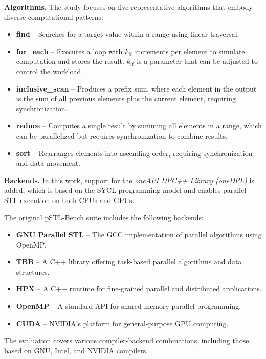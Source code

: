 \documentclass[sigconf]{acmart}
\newcommand{\mypar}[1]{{\bf #1.}}
\begin{document}
\mypar{Algorithms} The study focuses on five representative algorithms that embody diverse computational patterns:
\begin{itemize}
      \item \textbf{find} – Searches for a target value within a range using linear traversal.
      \item \textbf{for\_each} – Executes a loop with $k_{it}$ increments per element to simulate computation and stores the result.
            $k_{it}$ is a parameter that can be adjusted to control the workload.
      \item \textbf{inclusive\_scan} – Produces a prefix sum, where each element in the output is the sum of all previous elements
            plus the current element, requiring synchronization.
      \item \textbf{reduce} – Computes a single result by summing all elements in a range, which can be parallelized
            but requires synchronization to combine results.
      \item \textbf{sort} – Rearranges elements into ascending order, requiring synchronization and data movement.
\end{itemize}

\mypar{Backends} In this work, support for the \textit{oneAPI DPC++ Library (oneDPL)} is added, which is based on the SYCL
programming model and enables parallel STL execution on both CPUs and GPUs.

The original pSTL-Bench suite includes the following backends:
\begin{itemize}
      \item \textbf{GNU Parallel STL} – The GCC implementation of parallel algorithms using OpenMP.
      \item \textbf{TBB} – A C++ library offering task-based parallel algorithms and data structures.
      \item \textbf{HPX} – A C++ runtime for fine-grained parallel and distributed applications.
      \item \textbf{OpenMP} – A standard API for shared-memory parallel programming.
      \item \textbf{CUDA} – NVIDIA’s platform for general-purpose GPU computing.
\end{itemize}

The evaluation covers various compiler-backend combinations, including those
based on GNU, Intel, and NVIDIA compilers.
\end{document}
